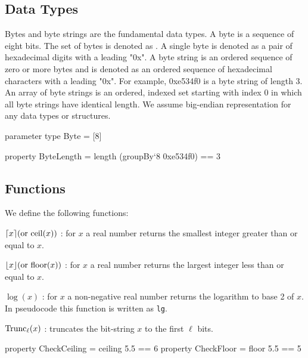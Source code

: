 \subsection{Data Types}
Bytes and byte strings are the fundamental data types.  A byte is a
sequence of eight bits. The set of bytes is denoted as \byte. A single byte is 
denoted as a pair of
hexadecimal digits with a leading "0x".  A byte string is an ordered
sequence of zero or more bytes and is denoted as an ordered sequence
of hexadecimal characters with a leading "0x".  For example, 0xe534f0
is a byte string of length $3$.  An array of byte strings is an
ordered, indexed set starting with index $0$ in which all byte strings
have identical length.  We assume big-endian representation for any
data types or structures.

\begin{code}
  parameter
    type Byte = [8]

  property ByteLength = length (groupBy`{8} 0xe534f0) == 3
\end{code}

\subsection{Functions}
We define the following
functions:
\begin{description}
 \item $\lceil x\rceil (\text{or }\textrm{ceil}(x))$ : for $x$ a real number returns the smallest integer greater than or equal to $x$.
 \item $\lfloor x\rfloor (\text{or }\textrm{floor}(x))$ : for $x$ a real number returns the largest integer less than or equal to $x$.
 \item $\log(x)$ : for $x$ a non-negative real number
returns the logarithm to base 2 of $x$. In pseudocode this function is written as \texttt{lg}.
 \item $\text{Trunc}_\ell(x)$ : truncates the bit-string $x$ to the first $\ell$ bits.
\end{description}

\begin{code}
  property CheckCeiling = ceiling 5.5 == 6
  property CheckFloor = floor 5.5 == 5
\end{code}

